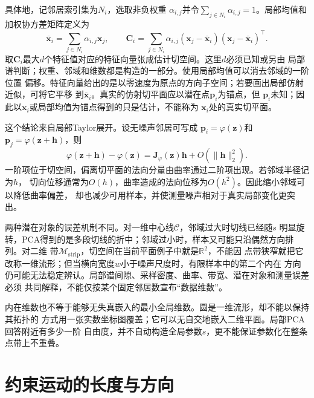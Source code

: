 具体地，记邻居索引集为$N_i$，选取非负权重
$\alpha_{i,j}$并令$\sum_{j\in N_i}\alpha_{i,j}=1$。局部均值和加权协方差矩阵定义为
\begin{equation}
  \overline{\bm{x}}_i
  =
  \sum_{j\in N_i}\alpha_{i,j}\bm{x}_j,
  \qquad
  \bm{C}_i
  =
  \sum_{j\in N_i}
  \alpha_{i,j}
  (\bm{x}_j-\overline{\bm{x}}_i)
  (\bm{x}_j-\overline{\bm{x}}_i)^{\top}.
  \label{eq:geometry-local-weighted-covariance}
\end{equation}
取$\bm{C}_i$最大$d$个特征值对应的特征向量张成估计切空间。这里$d$必须已知或另由
局部谱判断；权重、邻域和维数都是构造的一部分。使用局部均值可以消去邻域的一阶位置
偏移。特征向量给出的是以零速度为原点的方向子空间；若要画出局部仿射近似，可将它平移
到$\overline{\bm{x}}_i$。真实的仿射切平面应以潜在点$\bm{p}_i$为锚点，但
$\bm{p}_i$未知；因此以$\bm{x}_i$或局部均值为锚点得到的只是估计，不能称为
$\bm{x}_i$处的真实切平面。

这个结论来自局部Taylor展开。设无噪声邻居可写成
$\bm{p}_i=\varphi(\bm{z})$和
$\bm{p}_j=\varphi(\bm{z}+\bm{h})$，则
\begin{equation}
  \varphi(\bm{z}+\bm{h})-\varphi(\bm{z})
  =
  \bm{J}_{\varphi}(\bm{z})\bm{h}
  +
  O(\lVert\bm{h}\rVert_2^2).
  \label{eq:geometry-manifold-local-taylor}
\end{equation}
一阶项位于切空间，偏离切平面的法向分量由曲率通过二阶项出现。若邻域半径记为$h$，
切向位移通常为$O(h)$，曲率造成的法向位移为$O(h^2)$。因此缩小邻域可以降低曲率偏差，
却也减少可用样本，并使测量噪声相对于真实局部变化更突出。

两种潜在对象的误差机制不同。对一维中心线$\mathcal{C}$，邻域过大时切线已经随$s$
明显旋转，PCA得到的是多段切线的折中；邻域过小时，样本又可能只沿偶然方向排列。对二维
带$\mathcal{M}_{\mathrm{strip}}$，切空间在当前平面例子中就是$\mathbb{R}^2$，不能因
点带狭窄就把它改称一维流形；但当横向宽度$w$小于噪声尺度时，有限样本中的第二个内在
方向仍可能无法稳定辨认。局部谱间隙、采样密度、曲率、带宽、潜在对象和测量误差必须
共同解释，不能仅按某个固定邻居数宣布“数据维数”。

内在维数也不等于能够无失真嵌入的最小全局维数。圆是一维流形，却不能以保持其拓扑的
方式用一张实数坐标图覆盖；它可以无自交地嵌入二维平面。局部PCA回答附近有多少一阶
自由度，并不自动构造全局参数$s$，更不能保证参数化在整条点带上不重叠。

\section{约束运动的长度与方向}
\label{sec:geometry-metric-path-geodesic}

